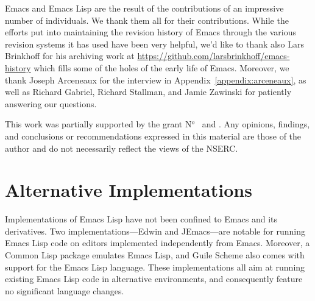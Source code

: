 \documentclass[format=acmsmall,screen]{acmart}
\newcommand \Elisp {Emacs Lisp}
\begin{document}


\begin{acks}
Emacs and \Elisp{} are the result of the contributions of an impressive
number of individuals.  We thank them all for their contributions.
While the efforts put into maintaining the
revision history of Emacs through the various revision systems it has used
have been very helpful, we'd like to thank also Lars Brinkhoff for his
archiving work at \url{https://github.com/larsbrinkhoff/emacs-history} which
fills some of the holes of the early life of Emacs.
Moreover, we thank Joseph Arceneaux for the
interview in Appendix~\ref{appendix:arceneaux}, as well as Richard Gabriel,
Richard Stallman, and Jamie Zawinski for patiently answering our questions.

This work was partially supported by the  grant
N$^o$~ and .
Any opinions, findings, and conclusions or recommendations expressed in this
material are those of the author and do not necessarily reflect the views of
the NSERC.
\end{acks}

\appendix

\section{Alternative Implementations}
\label{sec:alternative-implementations}

Implementations of \Elisp{} have not been confined to Emacs and its
derivatives.  Two imp\-lemen\-tations---Edwin and JEmacs---are notable for
running \Elisp{} code on editors implemented independently from Emacs.
Moreover, a Common Lisp package emulates Emacs Lisp, and Guile Scheme
also comes with support for the \Elisp{} language.
These implementations all aim at running existing \Elisp{}
code in alternative environments, and consequently feature no
significant language changes.
\end{document}
